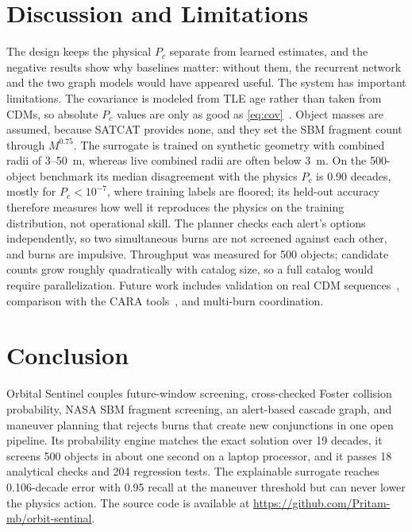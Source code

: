 \documentclass[conference]{IEEEtran}
\newcommand{\Pc}{P_c}
\begin{document}
\section{Discussion and Limitations}
\label{sec:discussion}

The design keeps the physical $\Pc$ separate from learned estimates, and the
negative results show why baselines matter: without them, the recurrent network
and the two graph models would have appeared useful. The system has important
limitations. The covariance is modeled from TLE age
rather than taken from CDMs, so absolute $\Pc$ values are only as good as
\eqref{eq:cov}~\cite{alfriend1999,hall2019}. Object masses are assumed, because
SATCAT provides none, and they set the SBM fragment count through $M^{0.75}$.
The surrogate is trained on synthetic geometry with combined radii of 3--50~m,
whereas live combined radii are often below 3~m. On the 500-object benchmark
its median disagreement with the physics $\Pc$ is 0.90 decades, mostly for
$\Pc<10^{-7}$, where training labels are floored; its held-out accuracy
therefore measures how well it reproduces the physics on the training
distribution, not operational skill. The planner checks each alert's options
independently, so two simultaneous burns are not screened against each other,
and burns are impulsive. Throughput was measured for 500 objects; candidate
counts grow roughly quadratically with catalog size, so a full catalog would
require parallelization. Future work includes validation on real CDM
sequences~\cite{uriot2022}, comparison with the CARA tools~\cite{caratools},
and multi-burn coordination.

\section{Conclusion}
\label{sec:conclusion}

Orbital Sentinel couples future-window screening, cross-checked Foster
collision probability, NASA SBM fragment screening, an alert-based cascade
graph, and maneuver planning that rejects burns that create new conjunctions in
one open pipeline. Its probability engine matches the exact solution over 19
decades, it screens 500 objects in about one second on a laptop processor, and
it passes 18 analytical checks and 204 regression tests. The explainable
surrogate reaches 0.106-decade error with 0.95 recall at the maneuver threshold
but can never lower the physics action. The source code is available at
\url{https://github.com/Pritam-mb/orbit-sentinal}.
\end{document}
